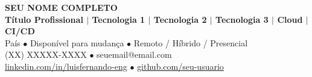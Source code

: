\documentclass[a4paper,10pt]{article}
\begin{document}
%
%

\begin{center}
{\LARGE \textbf{SEU NOME COMPLETO}} \\[3pt]
\textbf{Título Profissional $|$ Tecnologia 1 $|$ Tecnologia 2 $|$ Tecnologia 3 $|$ Cloud $|$ CI/CD} \\[4pt]
\small
País $\bullet$ Disponível para mudança $\bullet$ Remoto / Híbrido / Presencial \\
(XX) XXXXX-XXXX $\bullet$ seuemail@email.com \\
\href{https://www.linkedin.com/in/luisfernando-eng}{linkedin.com/in/luisfernando-eng}
$\bullet$
\href{https://github.com/seu-usuario}{github.com/seu-usuario}
\end{center}



%
%
%
\end{document}
